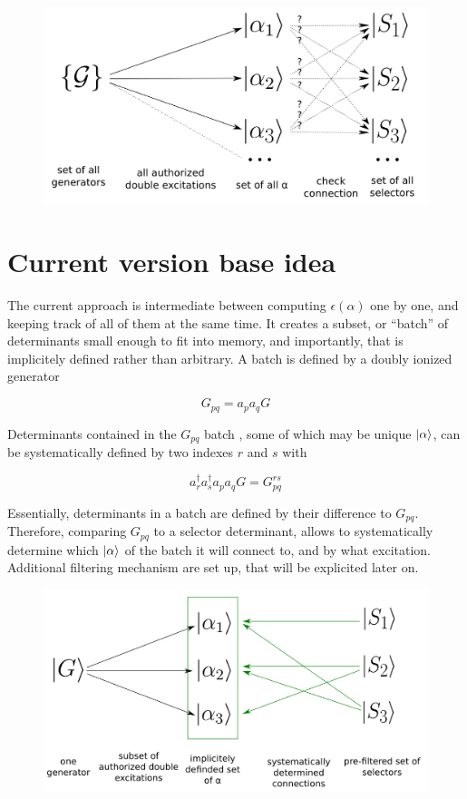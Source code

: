 \documentclass[./thesis.tex]{subfiles}
\begin{document}
\begin{figure}[h!]
	\begin{center}
		\includegraphics[width=0.7\columnwidth]{figures/cipsi/old_cipsi}
		\caption{{\label{selexemple2}%
		}}
	\end{center}
\end{figure}


\section{Current version base idea}

The current approach is intermediate between computing $\epsilon(\alpha)$ one by one, and keeping track of all of them at the same time.
It creates a subset, or ``batch'' of determinants small enough to fit into memory, and importantly, that is implicitely defined rather than arbitrary.
A batch is defined by a doubly ionized generator


\begin{equation}
G_{pq} = a_p a_q G
\end{equation}



Determinants contained in the $G_{pq}$ batch , some of which may be unique $\ket \alpha$, can be systematically defined by two indexes $r$ and $s$ with

\begin{equation}
a^\dagger_r a^\dagger_s a_p a_q  G = G^{rs}_{pq}
\end{equation}

Essentially, determinants in a batch are defined by their difference to $G_{pq}$. Therefore, comparing $G_{pq}$ to a selector determinant, allows to systematically determine which ${\ket{\alpha}}$ of the batch it will connect to, and by what excitation. Additional filtering mechanism are set up, that will be explicited later on.

\begin{figure}[h!]
	\begin{center}
		\includegraphics[width=0.7\columnwidth]{figures/cipsi/new_cipsi}
		\caption{{\label{selexemple2}%
		}}
	\end{center}
\end{figure}
\end{document}
